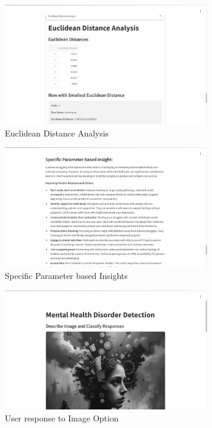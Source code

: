 \begin{figure}[h!]  
    \centering
    \includegraphics[width=0.8\textwidth]{App Images/24 Interface.png}  
    \caption{Euclidean Distance Analysis}
    \label{10i23445}  %
\end{figure} 

\begin{figure}[h!]  
    \centering
    \includegraphics[width=0.8\textwidth]{App Images/25 Interface.png}  
    \caption{Specific Parameter based Insights}
    \label{10i23445}  %
\end{figure} 

\pagebreak

\begin{figure}[h!]  
    \centering
    \includegraphics[width=0.8\textwidth]{App Images/26 Interface.png}  
    \caption{User response to Image Option} 
    \label{10i23445}  %
\end{figure} 

